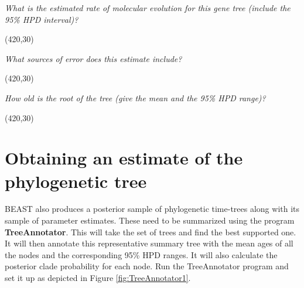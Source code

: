 \documentclass[11pt]{article}
\theoremstyle{plain}%
\theoremstyle{definition}
\theoremstyle{remark}
\begin{document}
\textit{What is the estimated rate of molecular evolution for this gene tree (include the 95\% HPD interval)?}

\vspace{5 mm}
\framebox(420,30){}
\vspace{5 mm}

\textit{What sources of error does this estimate include?}

\vspace{5 mm}
\framebox(420,30){}
\vspace{5 mm}


\textit{How old is the root of the tree (give the mean and the 95\% HPD range)?}

\vspace{5 mm}
\framebox(420,30){}
\vspace{5 mm}
  
%   
%
%
%
%
\newpage

\section{Obtaining an estimate of the phylogenetic tree}

BEAST also produces a posterior sample of phylogenetic time-trees along with its sample of parameter estimates. 
These need to be summarized using the program {\bf TreeAnnotator}. This will take the set of trees and find the best
supported one. It will then annotate this representative summary tree with the mean ages of all the
nodes and the corresponding 95\% HPD ranges. It will also calculate the posterior clade probability for each
node. Run the TreeAnnotator program and set it up as depicted in Figure \ref{fig:TreeAnnotator1}.
\end{document}
